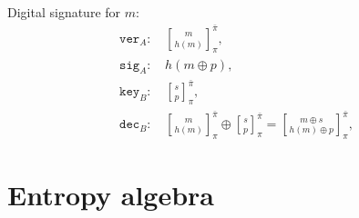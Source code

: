\documentclass[twocolumn, aps, amsmath, amssymb, nofootinbib, superscriptaddress, longbibliography, doublefloatfix, table-of-contents, eqsecnum, rmp]{revtex4-2}
\newcommand{\stackbraid}[2]{{\genfrac{[}{]}{0pt}{}{{#1}}{{#2}}}^{\bar{\pi}}_{\pi}}
\begin{document}
Digital signature for $m$:
\begin{align}
	\mathtt{ver}_A:\, &\stackbraid{m}{h(m)},\nonumber\\
	\mathtt{sig}_A:\, &h(m\oplus p),\nonumber\\
	\mathtt{key}_B:\, &\stackbraid{s}{p},\nonumber\\
	\mathtt{dec}_B:\, &\stackbraid{m}{h(m)}\oplus \stackbraid{s}{p} = \stackbraid{m\oplus s}{h(m)\oplus p},
\end{align}


%

\section{Entropy algebra}
\end{document}
